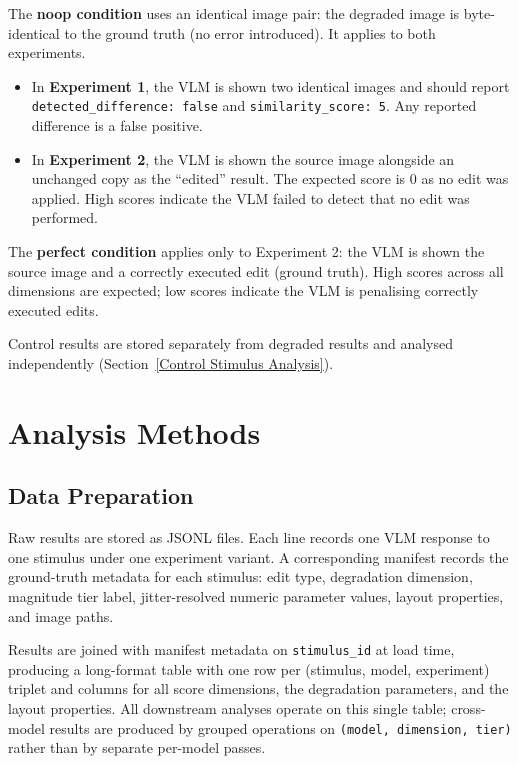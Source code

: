 The \textbf{noop condition} uses an identical image pair: the degraded image is byte-identical to the ground truth (no error introduced). It applies to both experiments.

\begin{itemize}
    \item In \textbf{Experiment 1}, the VLM is shown two identical images and should report \texttt{detected\_difference: false} and \texttt{similarity\_score: 5}. Any reported difference is a false positive.
    \item In \textbf{Experiment 2}, the VLM is shown the source image alongside an unchanged copy as the ``edited'' result. The expected score is 0 as no edit was applied. High scores indicate the VLM failed to detect that no edit was performed.
\end{itemize}

The \textbf{perfect condition} applies only to Experiment 2: the VLM is shown the source image and a correctly executed edit (ground truth). High scores across all dimensions are expected; low scores indicate the VLM is penalising correctly executed edits.

Control results are stored separately from degraded results and analysed independently (Section~\ref{Control Stimulus Analysis}).


\section{Analysis Methods} \label{Analysis Methods}

\subsection{Data Preparation} \label{Data Preparation}

Raw results are stored as JSONL files. Each line records one VLM response to one stimulus under one experiment variant. A corresponding manifest records the ground-truth metadata for each stimulus: edit type, degradation dimension, magnitude tier label, jitter-resolved numeric parameter values, layout properties, and image paths.

Results are joined with manifest metadata on \texttt{stimulus\_id} at load time, producing a long-format table with one row per (stimulus, model, experiment) triplet and columns for all score dimensions, the degradation parameters, and the layout properties. All downstream analyses operate on this single table; cross-model results are produced by grouped operations on \texttt{(model, dimension, tier)} rather than by separate per-model passes.

